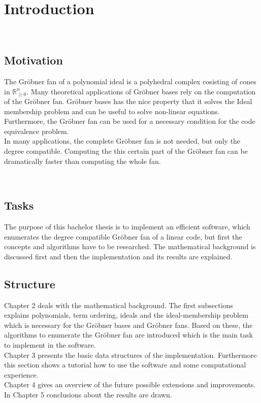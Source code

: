\section{Introduction}

~\\
\subsection{Motivation}
The Gröbner fan of a polynomial ideal is a polyhedral complex cosisting of cones in $\mathbb{R}_{\geq 0}^{n}$.
Many theoretical applications of Gröbner bases rely on the computation of the Gröbner fan.
Gröbner bases has the nice property that it solves the Ideal membership problem and can be useful to solve non-linear equations.
Furthermore, the Gröbner fan can be used for a necessary condition for the code equivalence problem. \\
In many applications, the complete Gröbner fan is not needed, but only the degree compatible. 
Computing the this certain part of the Gröbner fan can be dramatically faster than computing the whole fan.

~\\

\subsection{Tasks}
The purpose of this bachelor thesis is to implement an efficient software, which enumerates the degree compatible Gröbner fan of a linear code, but first the concepts and algorithms have to be researched. The mathematical background is discussed first and then the implementation and its results are explained. 

\newpage

\subsection{Structure}
Chapter 2 deals with the mathematical background. The first subsections explains polynomials, term ordering, ideals and the ideal-membership problem which is necessary for the Gröbner bases and Gröbner fans. Based on these, the algorithms to enumerate the Gröbner fan are introduced which is the main task to implement in the software.\\
Chapter 3 presents the basic data structures of the implementation. Furthermore this section shows a tutorial how to use the software and some computational experience.\\
Chapter 4 gives an overview of the future possible extensions and improvements.\\
In Chapter 5 conclusions about the results are drawn.
\newpage